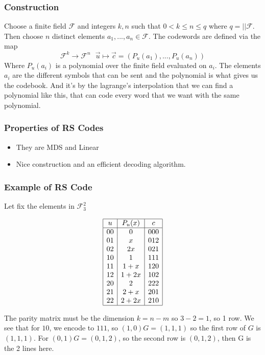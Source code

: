 \documentclass{article}
\begin{document}
\subsubsection{Construction} Choose a finite field $ \mathcal{F} $ and integers $ k,n $ such that $ 0 < k \leq n \leq q $ where $ q = ||\mathcal{F} $. Then choose $ n $ distinct elements $ a_1,...,a_n \in \mathcal{F} $. The codewords are defined via the map
\begin{equation}
\mathcal{F}^k \rightarrow \mathcal{F}^{n} \textit{   } \vec{u} \longmapsto \vec{c} = (P_{u}(a_1),...,P_{u}(a_n))
\end{equation}
Where $ P_{u}(a_i) $ is a polynomial over the finite field evaluated on $ a_i $. The elements $ a_i $ are the different symbols that can be sent and the polynomial is what gives us the codebook. And it's by the lagrange's interpolation that we can find a polynomial like this, that can code every word that we want with the same polynomial.

\subsubsection{Properties of RS Codes}
\begin{itemize}
\item They are MDS and Linear
\item Nice construction and an efficient decoding algorithm.
\end{itemize}

\subsubsection{Example of RS Code} Let fix the elements in $ \mathcal{F}_{3}^{2} $
\begin{center}
\[ %
\begin{array}{|c|c|c|} \hline %
u & P_u(x) & c\\ \hline
00 & 0 & 000\\
01 & x & 012\\
02 & 2x & 021\\
10 & 1 & 111\\
11 & 1 + x & 120\\
12 & 1 + 2x & 102\\
20 & 2 & 222\\
21 & 2 + x & 201\\
22 & 2 + 2x & 210\\
\hline
\end{array} %
\] %
\end{center}
The parity matrix must be the dimension $ k = n - m $ so $ 3 - 2 = 1 $, so 1 row. We see that for $ 10 $, we encode to $ 111 $, so $ (1,0)G = (1,1,1) $ so the first row of $ G $ is $ (1,1,1) $. For $ (0,1)G = (0,1,2) $, so the second row is $ (0,1,2) $, then G is the 2 lines here.
\end{document}
